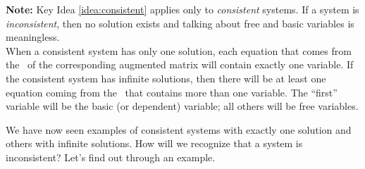 
\textsf{\textbf{Note:}} Key Idea \ref{idea:consistent} applies only to \textit{consistent} systems. If a system is \textit{inconsistent}, then no solution exists and talking about free and basic variables is meaningless.\\

When a consistent system has only one solution, each equation that comes from the \rref\ of the corresponding augmented matrix will contain exactly one variable. If the consistent system has infinite solutions, then there will be at least one equation coming from the \rref\ that contains more than one variable. The ``first'' variable will be the basic (or dependent) variable; all others will be free variables. 

We have now seen examples of consistent systems with exactly one solution and others with infinite solutions. How will we recognize that a system is inconsistent? Let's find out through an example.\\



